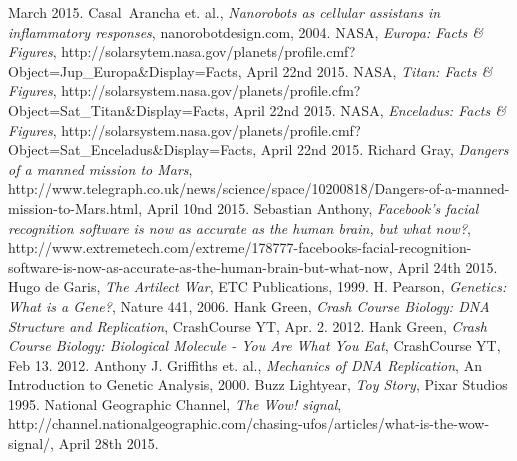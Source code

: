 \begin{thebibliography}{99}
		March 2015.
		Casal\, Arancha et. al.,
		\emph{Nanorobots as cellular assistans in inflammatory responses},
		nanorobotdesign.com,
		2004.
		NASA,
		\emph{Europa: Facts \& Figures},
		http://solarsytem.nasa.gov/planets/profile.cmf?Object=Jup\_Europa\&Display=Facts,
		April 22nd 2015.
		NASA,
		\emph{Titan: Facts \& Figures},
		http://solarsystem.nasa.gov/planets/profile.cfm?Object=Sat\_Titan\&Display=Facts,
		April 22nd 2015.
		NASA,
		\emph{Enceladus: Facts \& Figures},
		http://solarsystem.nasa.gov/planets/profile.cmf?Object=Sat\_Enceladus\&Display=Facts,
		April 22nd 2015.
		Richard Gray,
		\emph{Dangers of a manned mission to Mars},
		http://www.telegraph.co.uk/news/science/space/10200818/Dangers-of-a-manned-mission-to-Mars.html,
		April 10nd 2015.
		Sebastian Anthony,
		\emph{Facebook’s facial recognition software is now as accurate as the human brain, but what now?},
		http://www.extremetech.com/extreme/178777-facebooks-facial-recognition-software-is-now-as-accurate-as-the-human-brain-but-what-now,
		April 24th 2015.
		Hugo de Garis,
		\emph{The Artilect War},
		ETC Publications,
		1999.
		H. Pearson,
		\emph{Genetics: What is a Gene?},
		Nature 441,
		2006.
		Hank Green,
		\emph{Crash Course Biology: DNA Structure and Replication},
		CrashCourse YT,
		Apr. 2. 2012.
		Hank Green,
		\emph{Crash Course Biology: Biological Molecule - You Are What You Eat},
		CrashCourse YT,
		Feb 13. 2012.
		Anthony J. Griffiths et. al.,
		\emph{Mechanics of DNA Replication},
		An Introduction to Genetic Analysis,
		2000.
		Buzz Lightyear,
		\emph{Toy Story},
		Pixar Studios 1995.
		National Geographic Channel,
		\emph{The Wow! signal},
		http://channel.nationalgeographic.com/chasing-ufos/articles/what-is-the-wow-signal/,
		April 28th 2015.
\end{thebibliography}